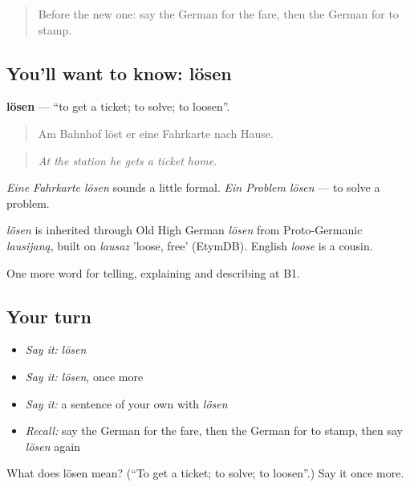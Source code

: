 \label{lesson:GE-C411-loesen}



\begin{quote}
Before the new one: say the German for the fare, then the German for to stamp.
\end{quote}

\subsection*{You'll want to know: lösen}
\textbf{lösen} — \textquotedblleft{}to get a ticket; to solve; to loosen\textquotedblright{}.

\begin{quote}
Am Bahnhof löst er eine Fahrkarte nach Hause.
\end{quote}

\begin{quote}
\emph{At the station he gets a ticket home.}
\end{quote}

\emph{Eine Fahrkarte lösen} sounds a little formal. \emph{Ein Problem lösen} — to solve a problem.

\begin{cousinweb}
\emph{lösen} is inherited through Old High German \emph{lōsen} from Proto-Germanic \emph{lausijaną}, built on \emph{lausaz} 'loose, free' (EtymDB). English \emph{loose} is a cousin.
\end{cousinweb}

\begin{grammarlens}[title={What you've built}]
One more word for telling, explaining and describing at B1.
\end{grammarlens}

\subsection*{Your turn}
\begin{itemize}
\raggedright
  \item \emph{Say it:} \emph{lösen}
  \item \emph{Say it:} \emph{lösen}, once more
  \item \emph{Say it:} a sentence of your own with \emph{lösen}
  \item \emph{Recall:} say the German for the fare, then the German for to stamp, then say \emph{lösen} again
\end{itemize}

\begin{tcolorbox}[breakable,colback=teal!4,colframe=teal!35!black,title={Before you move on}]
What does lösen mean? (\textquotedblleft{}To get a ticket; to solve; to loosen\textquotedblright{}.) Say it once more.
\end{tcolorbox}

